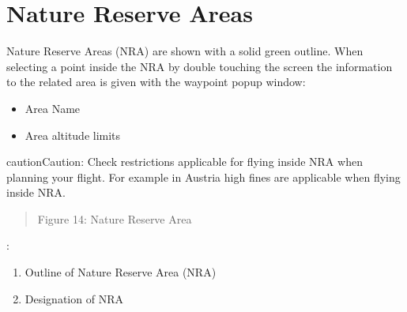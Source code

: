 \documentclass[letterpaper,10pt,english]{sphinxmanual}
\begin{document}
\section{Nature Reserve Areas}
\label{\detokenize{03-reference/airspace_display:nature-reserve-areas}}
\sphinxAtStartPar
Nature Reserve Areas (NRA) are shown with a solid green outline.
When selecting a point inside the NRA by double touching the screen the information to the related area is given with the waypoint pop\sphinxhyphen{}up window:
\begin{itemize}
\item {} 
\sphinxAtStartPar
Area Name

\item {} 
\sphinxAtStartPar
Area altitude limits

\end{itemize}

\begin{sphinxadmonition}{caution}{Caution:}
\sphinxAtStartPar
Check restrictions applicable for flying inside NRA when planning your flight. For example in Austria high fines are applicable when flying inside NRA.
\begin{quote}

\sphinxAtStartPar
Figure 14:  Nature Reserve Area
\end{quote}
\end{sphinxadmonition}

\begin{figure}[htbp]
\centering

\noindent{}
\end{figure}

\sphinxAtStartPar
{}:
\begin{enumerate}
%
\item {} 
\sphinxAtStartPar
Outline of Nature Reserve Area (NRA)

\item {} 
\sphinxAtStartPar
Designation of NRA

\end{enumerate}
\end{document}
